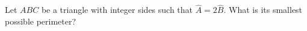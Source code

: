 Let $ABC$ be a triangle with integer sides such that $\hat{A} = 2\hat{B}$. What is its smallest possible perimeter?
